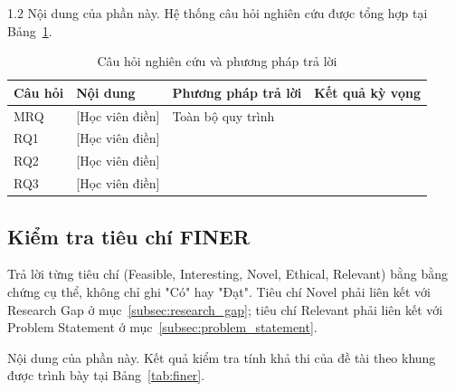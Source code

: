 \begin{spacing}{1.2}
Nội dung của phần này. Hệ thống câu hỏi nghiên cứu được tổng hợp tại Bảng~\ref{tab:rq}.

\begin{table}[htpb]
\centering
\caption{Câu hỏi nghiên cứu và phương pháp trả lời}
\label{tab:rq}
\renewcommand{\arraystretch}{1.3}
{\fontsize{12}{14}\selectfont
\begin{tabularx}{\textwidth}{|>{\raggedright\arraybackslash}p{1.8cm}|X|>{\raggedright\arraybackslash}p{3.6cm}|>{\raggedright\arraybackslash}p{3.2cm}|}
\hline
\textbf{Câu hỏi} & \textbf{Nội dung} & \textbf{Phương pháp trả lời} & \textbf{Kết quả kỳ vọng} \\
\hline
MRQ & [Học viên điền] & Toàn bộ quy trình & [Điền] \\
\hline
RQ1 & [Học viên điền] & [Điền] & [Điền] \\
\hline
RQ2 & [Học viên điền] & [Điền] & [Điền] \\
\hline
RQ3 & [Học viên điền] & [Điền] & [Điền] \\
\hline
\end{tabularx}
}
\end{table}

\subsection{Kiểm tra tiêu chí FINER}
\label{subsec:finer}

\begin{huongdan}
Trả lời từng tiêu chí (Feasible, Interesting, Novel, Ethical, Relevant) bằng bằng chứng cụ thể, không chỉ ghi "Có" hay "Đạt". Tiêu chí Novel phải liên kết với Research Gap ở mục~\ref{subsec:research_gap}; tiêu chí Relevant phải liên kết với Problem Statement ở mục~\ref{subsec:problem_statement}.
\end{huongdan}

Nội dung của phần này. Kết quả kiểm tra tính khả thi của đề tài theo khung  được trình bày tại Bảng~\ref{tab:finer}.


\end{spacing}
